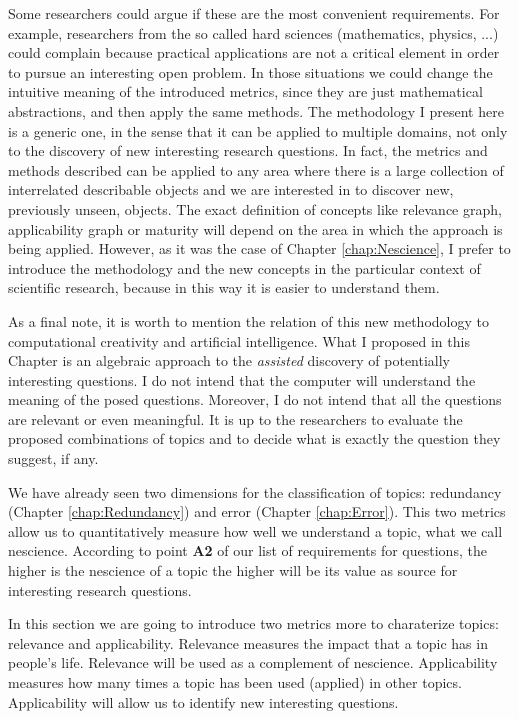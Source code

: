 \bigskip

Some researchers could argue if these are the most convenient requirements. For example, researchers from the so called hard sciences (mathematics, physics, ...) could complain because practical applications are not a critical element in order to pursue an interesting open problem. In those situations we could change the intuitive meaning of the introduced metrics, since they are just mathematical abstractions, and then apply the same methods. The methodology I present here is a generic one, in the sense that it can be applied to multiple domains, not only to the discovery of new interesting research questions. In fact, the metrics and methods described can be applied to any area where there is a large collection of interrelated describable objects and we are interested in to discover new, previously unseen, objects. The exact definition of concepts like relevance graph, applicability graph or maturity will depend on the area in which the approach is being applied. However, as it was the case of Chapter \ref{chap:Nescience}, I prefer to introduce the methodology and the new concepts in the particular context of scientific research, because in this way it is easier to understand them.

As a final note, it is worth to mention the relation of this new methodology to computational creativity and artificial intelligence. What I proposed in this Chapter is an algebraic approach to the \emph{assisted} discovery of potentially interesting questions. I do not intend that the computer will understand the meaning of the posed questions. Moreover, I do not intend that all the questions are relevant or even meaningful. It is up to the researchers to evaluate the proposed combinations of topics and to decide what is exactly the question they suggest, if any.

We have already seen two dimensions for the classification of topics: redundancy (Chapter \ref{chap:Redundancy}) and error (Chapter \ref{chap:Error}). This two metrics allow us to quantitatively measure how well we understand a topic, what we call nescience. According to point \textbf{A2} of our list of requirements for questions, the higher is the nescience of a topic the higher will be its value as source for interesting research questions.

In this section we are going to introduce two metrics more to charaterize topics: relevance and applicability. Relevance measures the impact that a topic has in people's life. Relevance will be used as a complement of nescience. Applicability measures how many times a topic has been used (applied) in other topics. Applicability will allow us to identify new interesting questions. 

